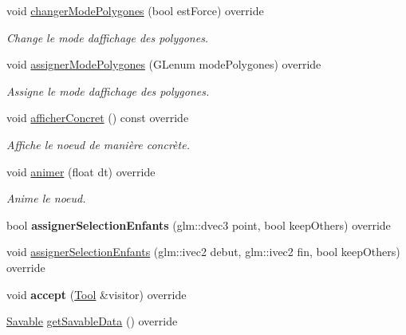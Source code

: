 \begin{DoxyCompactItemize}
void \hyperlink{group__inf2990_ga90bb01067866438b80d081967c133b81}{changer\+Mode\+Polygones} (bool est\+Force) override
\begin{DoxyCompactList}\small\item\em Change le mode d\textquotesingle{}affichage des polygones. \end{DoxyCompactList}\item 
void \hyperlink{group__inf2990_ga5caf8a3f9e06915463abdff7a473d95f}{assigner\+Mode\+Polygones} (G\+Lenum mode\+Polygones) override
\begin{DoxyCompactList}\small\item\em Assigne le mode d\textquotesingle{}affichage des polygones. \end{DoxyCompactList}\item 
void \hyperlink{group__inf2990_gaed396ee8ea0396e4a9cf56b69151204b}{afficher\+Concret} () const  override
\begin{DoxyCompactList}\small\item\em Affiche le noeud de manière concrète. \end{DoxyCompactList}\item 
void \hyperlink{group__inf2990_gac641c70147959a57b698854e016ff929}{animer} (float dt) override
\begin{DoxyCompactList}\small\item\em Anime le noeud. \end{DoxyCompactList}\item 
\hypertarget{group__inf2990_ga60b49df4f31e029056837529970ef67f}{}bool {\bfseries assigner\+Selection\+Enfants} (glm\+::dvec3 point, bool keep\+Others) override\label{group__inf2990_ga60b49df4f31e029056837529970ef67f}

\item 
void \hyperlink{group__inf2990_ga98e4e00d1d92ebe6774f72dc712ee6ca}{assigner\+Selection\+Enfants} (glm\+::ivec2 debut, glm\+::ivec2 fin, bool keep\+Others) override
\item 
\hypertarget{group__inf2990_ga0b60c180726f3a0501f42bc70bc0c52e}{}void {\bfseries accept} (\hyperlink{class_tool}{Tool} \&visitor) override\label{group__inf2990_ga0b60c180726f3a0501f42bc70bc0c52e}

\item 
\hyperlink{class_savable}{Savable} \hyperlink{group__inf2990_ga3fefd2b70f384f82cb6319f468c01a63}{get\+Savable\+Data} () override
\end{DoxyCompactItemize}
